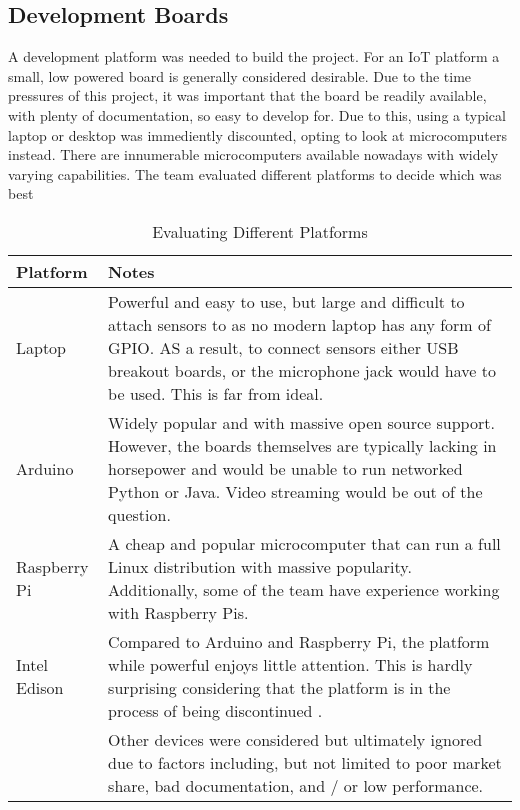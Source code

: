 \subsection{Development Boards}

A development platform was needed to build the project. For an IoT platform a small, low powered board is generally considered desirable. Due to the time pressures of this project, it was important that the board be readily available, with plenty of documentation, so easy to develop for. Due to this, using a typical laptop or desktop was immediently discounted, opting to look at microcomputers instead. There are innumerable microcomputers available nowadays with widely varying capabilities. The team evaluated different platforms to decide which was best

\begin{table}[ht]
\begin{tabularx}{\textwidth}{|l|X|}
\hline
\textbf{Platform} & \textbf{Notes} \\
\hline
Laptop & Powerful and easy to use, but large and difficult to attach sensors to as no modern laptop has any form of GPIO. AS a result, to connect sensors either USB breakout boards, or the microphone jack would have to be used. This is far from ideal.\\
\hline
Arduino & Widely popular and with massive open source support. However, the boards themselves are typically lacking in horsepower and would be unable to run networked Python or Java. Video streaming would be out of the question. \\ 
\hline
Raspberry Pi & A cheap and popular microcomputer that can run a full Linux distribution with massive popularity. Additionally, some of the team have experience working with Raspberry Pis.\\ 
\hline
Intel Edison & Compared to Arduino and Raspberry Pi, the platform while powerful enjoys little attention. This is hardly surprising considering that the platform is in the process of being discontinued \cite{2017ProductAction}. \\ 
\hline
 & Other devices were considered but ultimately ignored due to factors including, but not limited to poor market share, bad documentation, and / or low performance.\\ 
\hline
\end{tabularx}
\caption{Evaluating Different Platforms}
\label{evaluating-differernt-platforms}
\end{table}

